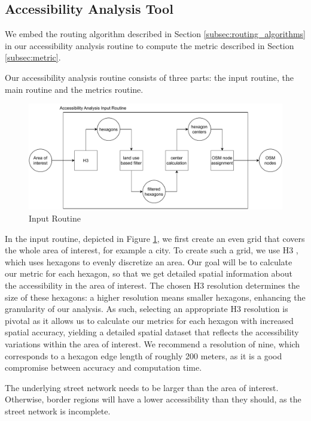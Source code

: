 \subsection{Accessibility Analysis Tool}
\label{subsec:combining}

We embed the routing algorithm described in Section \ref{subsec:routing_algorithms} in our accessibility analysis routine to compute the metric described in Section \ref{subsec:metric}.

Our accessibility analysis routine consists of three parts: the input routine, the main routine and the metrics routine.

\begin{figure}
    \centering
    \includegraphics[scale=0.75]{Figures/method/input_routine}
    \caption{Input Routine}
    \label{fig:input_routine}
\end{figure}
In the input routine, depicted in Figure \ref{fig:input_routine}, we first create an even grid that covers the whole area of interest, for example a city.
To create such a grid, we use H3 , which uses hexagons to evenly discretize an area.
Our goal will be to calculate our metric for each hexagon, so that we get detailed spatial information about the accessibility in the area of interest.
The chosen H3 resolution determines the size of these hexagons: a higher resolution means smaller hexagons, enhancing the granularity of our analysis. 
As such, selecting an appropriate H3 resolution is pivotal as it allows us to calculate our metrics for each hexagon with increased spatial accuracy, yielding a detailed spatial dataset that reflects the accessibility variations within the area of interest.
We recommend a resolution of nine, which corresponds to a hexagon edge length of roughly 200 meters, as it is a good compromise between accuracy and computation time.

The underlying street network needs to be larger than the area of interest.
Otherwise, border regions will have a lower accessibility than they should, as the street network is incomplete.

